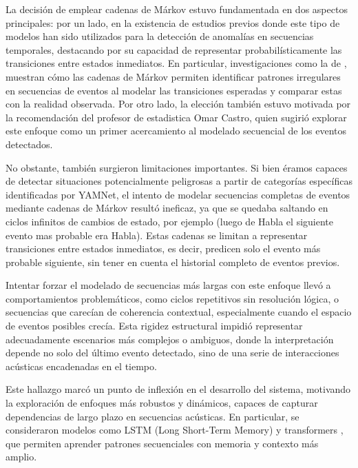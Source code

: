       La decisión de emplear cadenas de Márkov estuvo fundamentada en dos aspectos principales: por un lado, en la existencia de estudios previos donde este tipo de modelos han sido utilizados para la detección de anomalías en secuencias temporales, destacando por su capacidad de representar probabilísticamente las transiciones entre estados inmediatos. En particular, investigaciones como la de \citeauthor{boldt2020anomaly} \citeyear{boldt2020anomaly}, muestran cómo las cadenas de Márkov permiten identificar patrones irregulares en secuencias de eventos al modelar las transiciones esperadas y comparar estas con la realidad observada. Por otro lado, la elección también estuvo motivada por la recomendación del profesor de estadistica Omar Castro, quien sugirió explorar este enfoque como un primer acercamiento al modelado secuencial de los eventos detectados.

      No obstante, también surgieron limitaciones importantes. Si bien éramos capaces de detectar situaciones potencialmente peligrosas a partir de categorías específicas identificadas por YAMNet, el intento de modelar secuencias completas de eventos mediante cadenas de Márkov resultó ineficaz, ya que se quedaba saltando en ciclos infinitos de cambios de estado, por ejemplo (luego de Habla el siguiente evento mas probable era Habla). Estas cadenas se limitan a representar transiciones entre estados inmediatos, es decir, predicen solo el evento más probable siguiente, sin tener en cuenta el historial completo de eventos previos.

      Intentar forzar el modelado de secuencias más largas con este enfoque llevó a comportamientos problemáticos, como ciclos repetitivos sin resolución lógica, o secuencias que carecían de coherencia contextual, especialmente cuando el espacio de eventos posibles crecía. Esta rigidez estructural impidió representar adecuadamente escenarios más complejos o ambiguos, donde la interpretación depende no solo del último evento detectado, sino de una serie de interacciones acústicas encadenadas en el tiempo.

      Este hallazgo marcó un punto de inflexión en el desarrollo del sistema, motivando la exploración de enfoques más robustos y dinámicos, capaces de capturar dependencias de largo plazo en secuencias acústicas. En particular, se consideraron modelos como LSTM (Long Short-Term Memory) y transformers , que permiten aprender patrones secuenciales con memoria y contexto más amplio.



